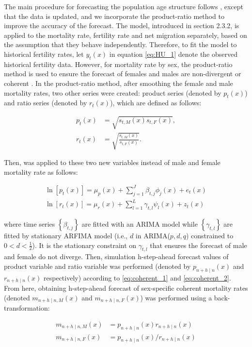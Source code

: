\documentclass[11pt,a4paper,]{article}
\begin{document}
The main procedure for forecasting the population age structure follows
\textcite{HB08}, except that the data is updated, and we incorporate the
product-ratio method \autocite{HBY13} to improve the accuracy of the
forecast. The \textcite{HU07} model, introduced in section 2.3.2, is
applied to the mortality rate, fertility rate and net migration
separately, based on the assumption that they behave independently.
Therefore, to fit the model to historical fertility rates, let
\(y_t(x)\) in equation \eqref{eq:HU_1} denote the observed historical
fertility data. However, for mortality rate by sex, the product-ratio
method is used to ensure the forecast of females and males are
non-divergent or coherent \autocite{HBY13}. In the product-ratio method,
after smoothing the female and male mortality rates, two other series
were created: product series (denoted by \(p_t(x)\)) and ratio series
(denoted by \(r_t(x)\)), which are defined as follows:

\begin{align}
  p_t(x)&=\sqrt{s_{t,M}(x)s_{t,F}(x)}, \label{eq:coherent_1}\\
  r_t(x)&=\sqrt{\frac{s_{t,M}(x)}{s_{t,F}(x)}}. \label{eq:coherent_2}
\end{align}

Then, \textcite{HU07} was applied to these two new variables instead of
male and female mortality rate as follows:

\begin{align*}
  \ln[p_t(x)]=\mu_p(x)+\sum_{j=1}^{J}\beta_{t,j}\phi_j(x)+e_t(x)\\
  \ln[r_t(x)]=\mu_r(x)+\sum_{l=1}^{L}\gamma_{t,l}\psi_l(x)+z_t(x)
\end{align*}

where time series \(\left\{\beta_{t,j}\right\}\) are fitted with an
ARIMA model while \(\left\{\gamma_{t,l}\right\}\) are fitted by
stationary ARFIMA model (i.e., \(d\) in ARIMA(\(p,d,q\)) constrained to
\(0<d<\frac{1}{2}\)). It is the stationary constraint on
\(\gamma_{t,l}\) that ensures the forecast of male and female do not
diverge. Then, simulation h-step-ahead forecast values of product
variable and ratio variable was performed (denoted by
\(p_{n+h\mid n}(x)\) and \(r_{n+h\mid n}(x)\) respectively) according to
\eqref{eq:coherent_1} and \eqref{eq:coherent_2}. From here, obtaining
h-step-ahead forecast of sex-specific coherent mortality rates (denoted
\(m_{n+h\mid n,M}(x)\) and \(m_{n+h\mid n,F}(x)\)) was performed using a
back-transformation:

\begin{align*}
  m_{n+h\mid n,M}(x) & = p_{n+h\mid n}(x)r_{n+h\mid n}(x)\\
  m_{n+h\mid n,F}(x) & = p_{n+h\mid n}(x)/r_{n+h\mid n}(x)
\end{align*}
\end{document}
